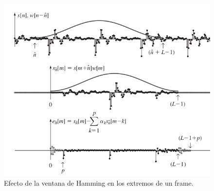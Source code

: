 \begin{figure}[H]
    \centering
    \includegraphics[scale=0.3]{img/hamming.png}
    \caption{Efecto de la ventana de Hamming en los extremos de un frame.}
    \label{fig:hamming}
\end{figure}


